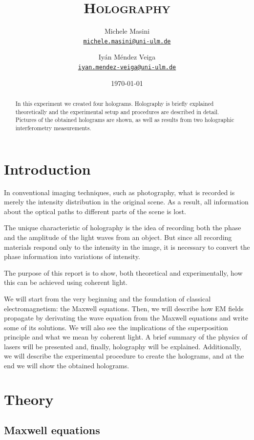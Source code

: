 \documentclass[11pt,a4paper]{article}
\title{\bfseries\textsc{Holography}}
\author{
Michele Masini\\ \small\texttt{\href{mailto:michele.masini@uni-ulm.de}{michele.masini@uni-ulm.de}}\and
Iyán Méndez Veiga\\ \small\texttt{\href{mailto:iyan.mendez-veiga@uni-ulm.de}{iyan.mendez-veiga@uni-ulm.de}}
}
\date{\today}
\begin{document}
\maketitle

\begin{abstract}
In this experiment we created four holograms. Holography is briefly explained theoretically and the experimental setup and procedures are described in detail. Pictures of the obtained holograms are shown, as well as results from two holographic interferometry measurements.
\end{abstract}

\vspace{1.5cm}

\section{Introduction}

In conventional imaging techniques, such as photography, what is recorded is merely the intensity distribution in the original scene. As a result, all information about the optical paths to different parts of the scene is lost.

The unique characteristic of holography is the idea of recording both the phase and the amplitude of the light waves from an object. But since all recording materials respond only to the intensity in the image, it is necessary to convert the phase information into variations of intensity.

The purpose of this report is to show, both theoretical and experimentally, how this can be achieved using coherent light.

We will start from the very beginning and the foundation of classical electromagnetism: the Maxwell equations. Then, we will describe how EM fields propagate by derivating the wave equation from the Maxwell equations and write some of its solutions. We will also see the implications of the superposition principle and what we mean by coherent light. A brief summary of the physics of lasers will be presented and, finally, holography will be explained. Additionally, we will describe the experimental procedure to create the holograms, and at the end we will show the obtained holograms.


\section{Theory}

\subsection{Maxwell equations}
\end{document}
